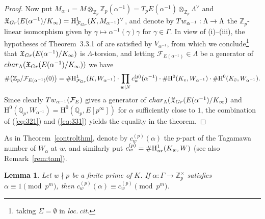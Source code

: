 \documentclass[10pt,reqno]{amsart}
\numberwithin{equation}{section}
\theoremstyle{plain}
\theoremstyle{definition}
\theoremstyle{definition}
\theoremstyle{plain}
\theoremstyle{plain}
\newtheorem{lemma}[thm]{Lemma}
\theoremstyle{plain}
\theoremstyle{plain}
\theoremstyle{plain}
\theoremstyle{plain}
\newcommand{\al}{\alpha} %
\newcommand{\Z}{\mathbb{Z}}
\newcommand{\Q}{\mathbb{Q}}
\newcommand{\X}{\mathfrak{X}}
\newcommand{\Fcal}{\mathcal{F}}
\newcommand{\rH}{\mathrm{H}}
\begin{document}
\begin{proof}
Now put $M_{\al^{-1}}=M\otimes_{\Z_p}\Z_p(\al^{-1})=T_pE(\alpha^{-1})\otimes_{\Z_p}\Lambda^\vee$ and $\X_{\rm Gr}(E(\al^{-1})/K_\infty)=\rH^1_{\Fcal_{\rm Gr}}(K,M_{\al^{-1}})^\vee$, and denote by ${\rm Tw}_{\al^{-1}}:\Lambda\rightarrow\Lambda$ the $\Z_p$-linear isomorphism given by $\gamma\mapsto\al^{-1}(\gamma)\gamma$ for $\gamma\in\Gamma$. In view of (i)--(iii), %
the hypotheses of Theorem~3.3.1 of \cite{jsw} are satisfied by $V_{\al^{-1}}$, from which we conclude\footnote{taking $\Sigma=\emptyset$ in \emph{loc.\,cit.}} that $\X_{\rm Gr}(E(\al^{-1})/K_\infty)$ is $\Lambda$-torsion, and letting $\Fcal_{E(\al^{-1})}\in\Lambda$ be a generator of ${\rm char}_\Lambda(\X_{\rm Gr}(E(\al^{-1})/K_\infty))$ we have
\begin{equation}\label{eq:331}
\#\bigl(\Z_p /\Fcal_{E(\al^{-1})}(0)\bigr)= 
\#\rH^1_{\Fcal_{\rm Gr}}(K,W_{\al^{-1}})\cdot \prod_{w\mid N}c_w^{(p)}(\al^{-1})\cdot\#\rH^0(K_v,W_{\al^{-1}})\cdot\#\rH^0(K_{\bar{v}},W_{\al^{-1}}).
\end{equation}
Since clearly ${\rm Tw}_{\al^{-1}}(\Fcal_{E})$ gives a generator of ${\rm char}_\Lambda(\X_{\rm Gr}(E(\al^{-1})/K_\infty)$ and $\rH^0(\Q_p,W_{\al^{-1}})=\rH^0(\Q_p,E[p^\infty])$ for $\alpha$ sufficiently close to $1$, the combination of (\ref{eq:321}) and (\ref{eq:331}) yields the equality in the theorem.
\end{proof}

As in Theorem~\ref{controlthm}, denote by $c_w^{(p)}(\al)$ the $p$-part of the Tagamawa number of $W_{\al}$ at $w$, and similarly put $c_w^{(p)}=\#\rH^1_{\rm ur}(K_w,W)$ (see also Remark~\ref{rem:tam}).


\begin{lemma}\label{lemma:tam}
Let $w\nmid p$ be a finite prime of $K$. If  $\al:\Gamma\rightarrow\Z_p^\times$ satisfies $\al\equiv 1\pmod{ p^m}$, then $c_w^{(p)}(\al)\equiv c_w^{(p)}\pmod{p^m}$. 
\end{lemma}
\end{document}
